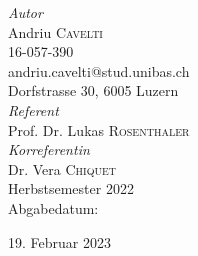 \begin{center}
	\large
	  \textit{Autor}\\
	  Andriu \textsc{Cavelti}\\
	  16-057-390\\
	  andriu.cavelti@stud.unibas.ch\\
	  Dorfstrasse 30, 6005 Luzern\\[1.5cm]

	  \textit{Referent}\\
	  Prof. Dr. Lukas \textsc{Rosenthaler}\\[0.5cm]
	  \textit{Korreferentin}\\
		Dr. Vera \textsc{Chiquet}\\[1.5cm]


	Herbstsemester 2022\\
	Abgabedatum: {\large\date 019. Februar 2023}\\[1cm]

	\end{center}

\restoregeometry

\newpage

